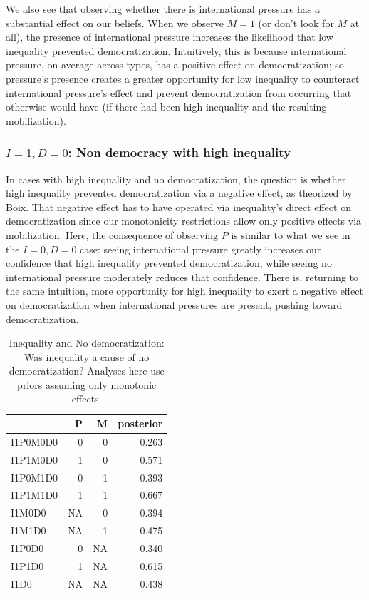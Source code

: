 \documentclass[12pt,]{book}
\begin{document}
We also see that observing whether there is international pressure has a substantial effect on our beliefs. When we observe \(M=1\) (or don't look for \(M\) at all), the presence of international pressure increases the likelihood that low inequality prevented democratization. Intuitively, this is because international pressure, on average across types, has a positive effect on democratization; so pressure's presence creates a greater opportunity for low inequality to counteract international pressure's effect and prevent democratization from occurring that otherwise would have (if there had been high inequality and the resulting mobilization).

\hypertarget{i1-d0-non-democracy-with-high-inequality}{%
\subsubsection{\texorpdfstring{\(I=1, D=0\): Non democracy with high inequality}{I=1, D=0: Non democracy with high inequality}}\label{i1-d0-non-democracy-with-high-inequality}}

In cases with high inequality and no democratization, the question is whether high inequality prevented democratization via a negative effect, as theorized by Boix. That negative effect has to have operated via inequality's direct effect on democratization since our monotonicity restrictions allow only positive effects via mobilization. Here, the consequence of observing \(P\) is similar to what we see in the \(I=0, D=0\) case: seeing international pressure greatly increases our confidence that high inequality prevented democratization, while seeing no international pressure moderately reduces that confidence. There is, returning to the same intuition, more opportunity for high inequality to exert a negative effect on democratization when international pressures are present, pushing toward democratization.

\begin{table}[t]

\caption{\label{tab:Tapp2}Inequality and No democratization: Was inequality a cause of no democratization? Analyses here use priors assuming only monotonic effects.}
\centering
\begin{tabular}{l|r|r|r}
\hline
  & P & M & posterior\\
\hline
I1P0M0D0 & 0 & 0 & 0.263\\
\hline
I1P1M0D0 & 1 & 0 & 0.571\\
\hline
I1P0M1D0 & 0 & 1 & 0.393\\
\hline
I1P1M1D0 & 1 & 1 & 0.667\\
\hline
I1M0D0 & NA & 0 & 0.394\\
\hline
I1M1D0 & NA & 1 & 0.475\\
\hline
I1P0D0 & 0 & NA & 0.340\\
\hline
I1P1D0 & 1 & NA & 0.615\\
\hline
I1D0 & NA & NA & 0.438\\
\hline
\end{tabular}
\end{table}
\end{document}
